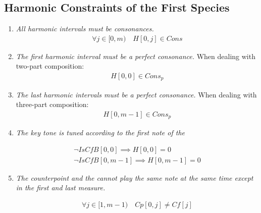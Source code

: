\subsection*{Harmonic Constraints of the First Species}
\begin{enumerate}[wide, label=\bfseries 1.H\arabic*]
  \item\label{rule:allcons}{\textit{All harmonic intervals must be consonances.}} 
\begin{equation}
    \begin{gathered}
        \forall j \in [0, m)\quad 
        H[0, j] \in Cons
    \end{gathered}
\end{equation}

\item\label{rule:firstpcons}{\textit{The first harmonic interval must be a perfect consonance.}}
When dealing with two-part composition:
\begin{equation}
    \begin{gathered}
        H[0, 0] \in Cons_{p}
    \end{gathered}
\end{equation}

\item\label{rule:lastpcons}{\textit{The last harmonic intervals must be a perfect consonance.}}
When dealing with three-part composition:
\begin{equation}
  \begin{gathered}
      H[0, m-1] \in Cons_{p}
  \end{gathered}
\end{equation}

\item\label{rule:keytone}{\textit{The key tone is tuned according to the first note of the \cfdot}}

\begin{equation}
    \begin{gathered}
        \lnot IsCfB[0, 0] \implies H[0, 0] = 0\\
        \lnot IsCfB[0, m-1] \implies H[0, m-1] = 0
    \end{gathered}
\end{equation}

\item{\textit{The counterpoint and the \cfs cannot play the same note at the same time except in the first and last measure.}}

\begin{equation}
    \begin{gathered}
        \forall j \in [1, m-1)\quad
        Cp[0, j] \neq Cf[j]
    \end{gathered}
\end{equation}


\end{enumerate}

